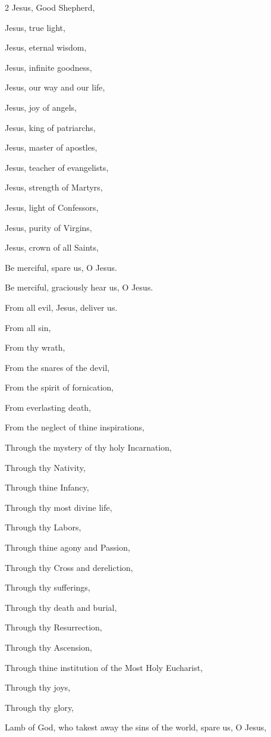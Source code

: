 \begin{enpars}
\begin{multicols}{2}
Jesus, Good Shepherd,

Jesus, true light,

Jesus, eternal wisdom,

Jesus, infinite goodness,

Jesus, our way and our life,

Jesus, joy of angels,

Jesus, king of patriarchs,

Jesus, master of apostles,

Jesus, teacher of evangelists,

Jesus, strength of Martyrs,

Jesus, light of Confessors,

Jesus, purity of Virgins,

Jesus, crown of all Saints,

Be merciful, spare us, O Jesus.

Be merciful, graciously hear us, O Jesus.

From all evil, Jesus, deliver us.

From all sin,

From thy wrath,

From the snares of the devil,

From the spirit of fornication,

From everlasting death,

From the neglect of thine inspirations,

Through the mystery of thy holy Incarnation,

Through thy Nativity,

Through thine Infancy,

Through thy most divine life,

Through thy Labors,

Through thine agony and Passion,

Through thy Cross and dereliction,

Through thy sufferings,

Through thy death and burial,

Through thy Resurrection,

Through thy Ascension,

Through thine institution of the Most Holy Eucharist,

Through thy joys,

Through thy glory,

Lamb of God, who takest away the sins of the world, spare us, O Jesus,


\end{multicols}
\end{enpars}
